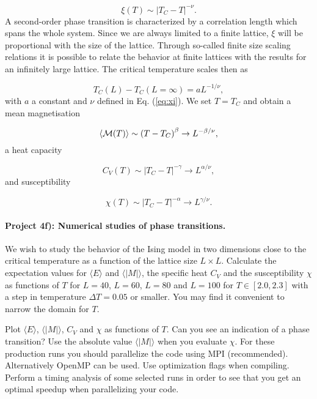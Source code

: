 \documentclass[%
oneside,                 %
final,                   %
10pt]{article}
\begin{document}
\begin{equation}
  \xi(T) \sim \left|T_C-T\right|^{-\nu}.
  \label{eq:xi}
\end{equation}
A second-order phase transition is characterized by a
correlation length which spans the whole system.
Since we are always limited to a finite lattice, $\xi$ will
be proportional with the size of the lattice. 
Through so-called finite size scaling relations
it is possible to relate the behavior at finite lattices with the 
results for an infinitely large lattice.
The critical temperature scales then as

\begin{equation}
 T_C(L)-T_C(L=\infty) = aL^{-1/\nu},
 \label{eq:tc}
\end{equation}
with  $a$ a constant and  $\nu$ defined in Eq. (\ref{eq:xi}).
We set $T=T_C$ and obtain a mean magnetisation

\begin{equation}
  \langle {\cal M}(T) \rangle \sim \left(T-T_C\right)^{\beta}
  \rightarrow L^{-\beta/\nu},
  \label{eq:scale1}
\end{equation}
a heat capacity

\begin{equation}
  C_V(T) \sim \left|T_C-T\right|^{-\gamma} \rightarrow L^{\alpha/\nu},
  \label{eq:scale2}
\end{equation}
and susceptibility

\begin{equation}
  \chi(T) \sim \left|T_C-T\right|^{-\alpha} \rightarrow L^{\gamma/\nu}.
  \label{eq:scale3}
\end{equation}


\paragraph{Project 4f): Numerical studies of phase transitions.}
We wish to study the behavior of the Ising model
in two dimensions close to the critical temperature as a function of
the lattice size $L\times L$. Calculate the expectation values for
$\langle E\rangle$ and $\langle \vert M\vert \rangle$, the specific heat
$C_V$ and the susceptibility $\chi$ as functions of $T$ for $L=40$,
$L=60$, $L=80$ and $L=100$ for $T\in [2.0,2.3]$ with a step in
temperature $\Delta T=0.05$ or smaller.  You may find it convenient to narrow the domain for $T$. 

Plot $\langle E\rangle$,
$\langle \vert M\vert\rangle$, $C_V$ and $\chi$ as functions of $T$. Can
you see an indication of a phase transition?  Use the absolute value
$\langle \vert M\vert\rangle$ when you evaluate $\chi$.  For these production runs you should
parallelize the code using MPI (recommended). Alternatively OpenMP can be used. Use optimization flags when compiling. Perform a timing analysis of some selected runs in order to see that you get an optimal speedup when parallelizing your code. 
\end{document}
